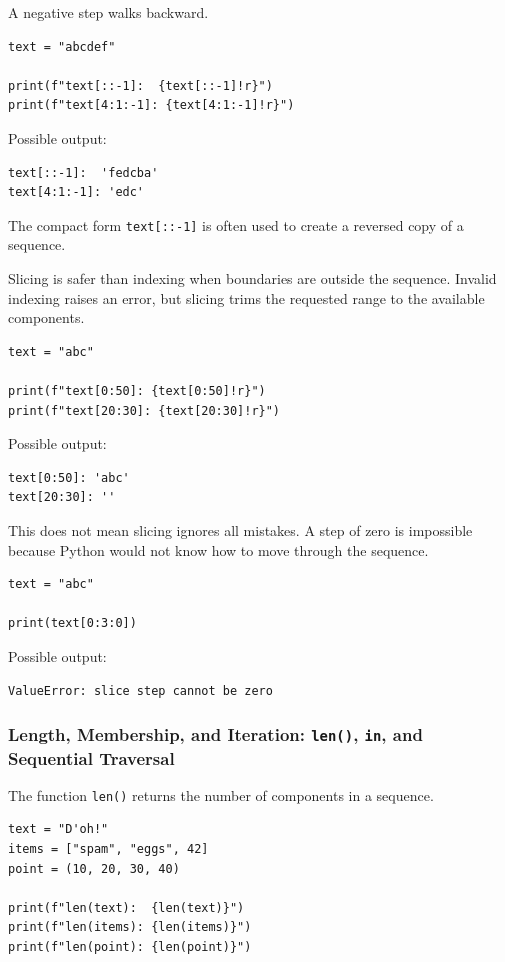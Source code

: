 A negative step walks backward.

\begin{verbatim}
text = "abcdef"

print(f"text[::-1]:  {text[::-1]!r}")
print(f"text[4:1:-1]: {text[4:1:-1]!r}")
\end{verbatim}

Possible output:

\begin{verbatim}
text[::-1]:  'fedcba'
text[4:1:-1]: 'edc'
\end{verbatim}

The compact form \texttt{text[::-1]} is often used to create a reversed copy of a sequence.

Slicing is safer than indexing when boundaries are outside the sequence. Invalid indexing raises an error, but slicing trims the requested range to the available components.

\begin{verbatim}
text = "abc"

print(f"text[0:50]: {text[0:50]!r}")
print(f"text[20:30]: {text[20:30]!r}")
\end{verbatim}

Possible output:

\begin{verbatim}
text[0:50]: 'abc'
text[20:30]: ''
\end{verbatim}

This does not mean slicing ignores all mistakes. A step of zero is impossible because Python would not know how to move through the sequence.

\begin{verbatim}
text = "abc"

print(text[0:3:0])
\end{verbatim}

Possible output:

\begin{verbatim}
ValueError: slice step cannot be zero
\end{verbatim}

\subsubsection{Length, Membership, and Iteration: \texttt{len()}, \texttt{in}, and Sequential Traversal}

The function \texttt{len()} returns the number of components in a sequence.

\begin{verbatim}
text = "D'oh!"
items = ["spam", "eggs", 42]
point = (10, 20, 30, 40)

print(f"len(text):  {len(text)}")
print(f"len(items): {len(items)}")
print(f"len(point): {len(point)}")
\end{verbatim}

